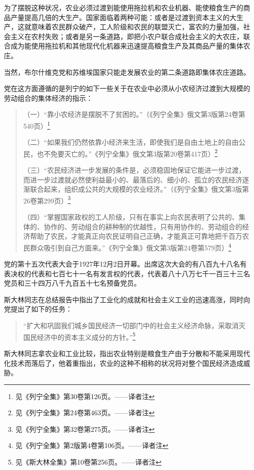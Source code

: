 为了摆脱这种状况，农业必须过渡到能使用拖拉机和农业机器、能使粮食生产的商品产量提高几倍的大生产。国家面临着两种可能：或者是过渡到资本主义的大生产，这就意味着农民群众破产，工人阶级和农民的联盟灭亡，富农的力量加强，社会主义在农村失败；或者是另一条道路，即把小农户联合成社会主义的大农庄，联合成为能使用拖拉机和其他现代化机器来迅速提高粮食生产及其商品产量的集体农庄。

当然，布尔什维克党和苏维埃国家只能走发展农业的第二条道路即集体农庄道路。

党在这方面遵循的是列宁的如下一些关于在农业中必须从小农经济过渡到大规模的劳动组合的集体经济的指示：

\begin{quotation}
（一）“靠小农经济是摆脱不了贫困的。”（《列宁全集》俄文第3版第24卷第540页）\footnote{见《列宁全集》第30卷第126页。——译者注}

（二）“如果我们仍然依靠小经济来生活，即使我们是自由土地上的自由公民，也不免要灭亡的。”《列宁全集》俄文第3版第20卷第417页）\footnote{见《列宁全集》第24卷第463页。——译者注}

（三）“农民经济进一步发展的条件是，必须稳固地保证它能进一步过渡，而进一步过渡就必然使利益最小的、最落后的、细小的、孤立的农民经济逐渐联合起来，组织成公共的大规模的农业经济。”（《列宁全集》俄文第3版第26卷第299页）\footnote{见《列宁全集》第32卷第275页。——译者注}

（四）“掌握国家政权的工人阶级，只有在事实上向农民表明了公共的、集体的、协作的、劳动组合的耕种制的优越性，只有用协作的、劳动组合的经济帮助了农民，才能真正向农民证明自己正确，才能真正可靠地把千百万农民群众吸引到自己方面来。”《列宁全集》俄文第3版第24卷第579页）\footnote{见《列宁全集》第2版第4卷第106页。——译者注}
\end{quotation}

党的第十五次代表大会于1927年12月2日开幕。出席这次大会的有八百九十八名有表决权的代表和七百七十一名有发言权的代表，代表着八十八万七千一百三十三名党员和三十四万八千九百五十七名预备党员。

斯大林同志在总结报告中指出了工业化的成就和社会主义工业的迅速高涨，同时向党提出了如下的任务：

\begin{quotation}
“扩大和巩固我们城乡国民经济一切部门中的社会主义经济命脉，采取消灭国民经济中的资本主义成分的方针。”\footnote{见《斯大林全集》第10卷第256页。——译者注}
\end{quotation}

斯大林同志拿农业和工业比较，指出农业特别是粮食生产由于分散和不能采用现代化技术而落后了，他着重指出，农业的这种不相称的状况将对整个国民经济造成威胁。

